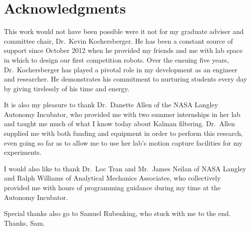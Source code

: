 \chapter*{Acknowledgments}

This work would not have been possible were it not for my graduate adviser and committee chair, Dr.~Kevin Kochersberger. He has been a constant source of support since October 2012 when he provided my friends and me with lab space in which to design our first competition robots. Over the ensuing five years, Dr.~Kochersberger has played a pivotal role in my development as an engineer and researcher. He demonstrates his commitment to nurturing students every day by giving tirelessly of his time and energy.

It is also my pleasure to thank Dr.~Danette Allen of the NASA Langley Autonomy Incubator, who provided me with two summer internships in her lab and taught me much of what I know today about Kalman filtering. Dr.~Allen supplied me with both funding and equipment in order to perform this research, even going so far as to allow me to use her lab's motion capture facilities for my experiments.

I would also like to thank Dr.~Loc Tran and Mr.~James Neilan of NASA Langley and Ralph Williams of Analytical Mechanics Associates, who collectively provided me with hours of programming guidance during my time at the Autonomy Incubator.

Special thanks also go to Samuel Rubenking, who stuck with me to the end. Thanks, Sam.